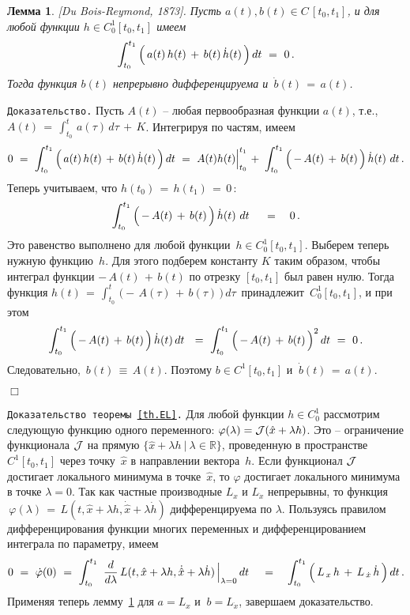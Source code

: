 \documentclass[12pt,a4paper]{article}
\newtheorem{lemma}{Лемма}
\newcommand{\re}{{\mathbb R}}
\newcommand{\cJ}{{\cal{J}}}
\begin{document}
\begin{lemma}\label{l.dbr}[Du Bois-Reymond, 1873].
Пусть $a(t), b(t) \in C\, [t_0, t_1]$, и  для любой функции $h \in
C_0^1[t_0, t_1]$ имеем
$$
\int_{t_0}^{t_1}\, \Bigl(\, a(t) \, h(t) \, + \, b(t)\, \dot h
(t)\, \Bigr)\, d t\ = \ 0\, .
$$
Тогда функция $b(t)$ непрерывно дифференцируема и $\,  \dot b(t)\, =
\, a(t)$.
\end{lemma}
{\tt Доказательство.} Пусть $A(t)$ -- любая  первообразная функции
$a(t)$, т.е., $A(t)\, = \, \int_{t_0}^{t}\, a(\tau)\, d \tau \, +
\, K$. Интегрируя по частям, имеем
$$
0 \ = \ \int_{t_0}^{t_1}\, \Bigl(\, a(t) \, h(t) \, + \, b(t)\,
\dot h (t)\, \Bigr)\, d t\ = \ A(t)h(t)\Bigl|_{t_0}^{t_1}\ + \
\int_{t_0}^{t_1}\, \Bigl(\, -\, A(t)  \, + \, b(t)\, \Bigr)\, \dot
h (t)\, \, d t\, .
$$
Теперь  учитываем, что $h(t_0)\, =\, h(t_1)\, = \, 0\, $:
$$
\int_{t_0}^{t_1}\, \Bigl(\, -\, A(t)  \, + \, b(t)\, \Bigr)\, \dot
h (t)\, \, d t\ \quad = \quad 0\, .
$$
Это равенство выполнено для любой функции~$h \in  C_0^1[t_0,
t_1]$. Выберем теперь нужную функцию~$h$. Для этого подберем
константу $K$ таким образом, чтобы интеграл функции $-\, A(t)  \,
+ \, b(t)$ по отрезку $[t_0, t_1]$ был равен нулю. Тогда функция
$h(t)\, = \, \int_{t_0}^t\, \bigl( -\, A(\tau)\, + \, b(\tau)\,
\bigr)\, d \tau\, $ принадлежит~$ C_0^1[t_0, t_1]$, и при этом
$$
\int_{t_0}^{t_1}\, \Bigl(\, -\, A(t)  \, + \, b(t)\, \Bigr)\, \dot
h (t)\, d t\ \ = \ \int_{t_0}^{t_1}\, \Bigl(\, -\, A(t)  \, + \,
b(t)\, \Bigr)^2\, d t\ = \ 0\, .
$$
Следовательно, $\, b(t)\, \equiv \,  A(t)$. Поэтому $b \in
C^1[t_0, t_1]$ и $\ \dot b(t)\, =\, a(t)$.


{\hfill $\Box$}
\smallskip


{\tt Доказательство теоремы~\ref{th.EL}.}
Для любой функции $h \in C^1_0$ рассмотрим
следующую функцию одного переменного: $\varphi(\lambda) = \cJ(\hat x +
 \lambda h)$.
Это -- ограничение функционала $\cJ$ на прямую $\{\hat x + \lambda h \ | \ \lambda \in \re\}$,
проведенную в пространстве~$C^1[t_0, t_1]$ через точку~$\hat x$ в направлении вектора~$h$.
Если функционал $\cJ$ достигает локального минимума в точке~$\hat x$, то
$\varphi$ достигает локального минимума в точке $\lambda = 0$.
Так как частные производные $L_{x}$ и
$L_{\dot x}$ непрерывны, то функция $\, \varphi (\lambda)\, = \,
L(t, \hat x + \lambda h, \dot {\hat x} + \lambda \dot h)$ дифференцируема по
$\lambda$. Пользуясь правилом дифференцирования функции многих
переменных и дифференцированием интеграла
 по параметру, имеем
 $$
0 \ = \ \dot \varphi(0)\ = \ \int_{t_0}^{t_1}\, \, \frac{d}{d \lambda} \, L(t, \hat x+\lambda h,
\dot {\hat x} + \lambda \dot h)\, \Bigr|_{\lambda =0} \, d t   \, \quad =
\quad \int_{t_0}^{t_1}\, \Bigl(\, L_{\, x} \, h \, + \, L_{\, \dot
x}\, \dot h\, \Bigr)\,  d t\, .
 $$
Применяя теперь лемму~\ref{l.dbr} для $a = L_x$ и  $\ b = L_{\dot x}$, завершаем доказательство.
\end{document}
